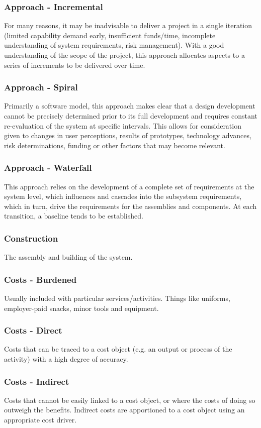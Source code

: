 \documentclass[journal]{IEEEtran}
\begin{document}
\subsubsection{Approach - Incremental}
For many reasons, it may be inadvisable to deliver a project in a single iteration (limited capability demand early, insufficient funds/time, incomplete understanding of system requirements, risk management). With a good understanding of the scope of the project, this approach allocates aspects to a series of increments to be delivered over time.
\subsubsection{Approach - Spiral}
Primarily a software model, this approach makes clear that a design development cannot be precisely determined prior to its full development and requires constant re-evaluation of the system at specific intervals. This allows for consideration given to changes in user perceptions, results of prototypes, technology advances, risk determinations, funding or other factors that may become relevant.
\subsubsection{Approach - Waterfall}
This approach relies on the development of a complete set of requirements at the system level, which influences and cascades into the subsystem requirements, which in turn, drive the requirements for the assemblies and components. At each transition, a baseline tends to be established.
\subsubsection{Construction}
The assembly and building of the system.
\subsubsection{Costs - Burdened}
Usually included with particular services/activities. Things like uniforms, employer-paid snacks, minor tools and equipment.
\subsubsection{Costs - Direct}
Costs that can be traced to a cost object (e.g. an output or process of the activity) with a high degree of accuracy.
\subsubsection{Costs - Indirect}
Costs that cannot be easily linked to a cost object, or where the costs of doing so outweigh the benefits. Indirect costs are apportioned to a cost object using an appropriate cost driver.
\end{document}
